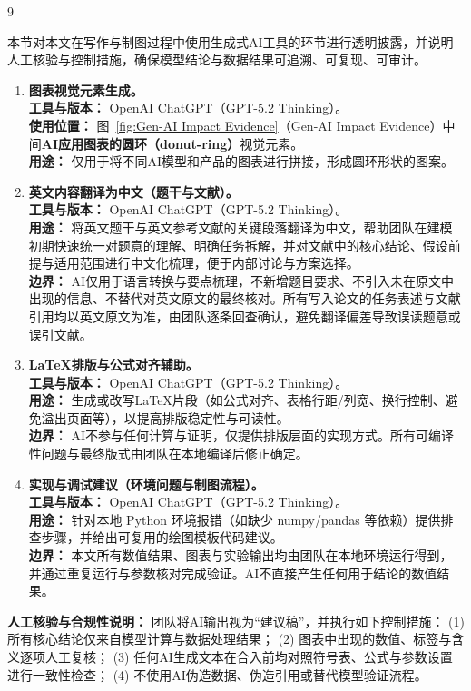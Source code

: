 \documentclass{mcmthesis}
\begin{document}
\begin{ReportAiUse}{9}

本节对本文在写作与制图过程中使用生成式AI工具的环节进行透明披露，并说明人工核验与控制措施，确保模型结论与数据结果可追溯、可复现、可审计。

\begin{enumerate}
\item \textbf{图表视觉元素生成。}\\
\textbf{工具与版本：} OpenAI ChatGPT（GPT-5.2 Thinking）。\\
\textbf{使用位置：} 图~\ref{fig:Gen-AI Impact Evidence}（Gen-AI Impact Evidence）中间\textbf{AI应用图表的圆环（donut-ring）}视觉元素。\\
\textbf{用途：} 仅用于将不同AI模型和产品的图表进行拼接，形成圆环形状的图案。\\


\item \textbf{英文内容翻译为中文（题干与文献）。}\\
\textbf{工具与版本：} OpenAI ChatGPT（GPT-5.2 Thinking）。\\
\textbf{用途：} 将英文题干与英文参考文献的关键段落翻译为中文，帮助团队在建模初期快速统一对题意的理解、明确任务拆解，并对文献中的核心结论、假设前提与适用范围进行中文化梳理，便于内部讨论与方案选择。\\
\textbf{边界：} AI仅用于语言转换与要点梳理，不新增题目要求、不引入未在原文中出现的信息、不替代对英文原文的最终核对。所有写入论文的任务表述与文献引用均以英文原文为准，由团队逐条回查确认，避免翻译偏差导致误读题意或误引文献。

\item \textbf{\LaTeX 排版与公式对齐辅助。}\\
\textbf{工具与版本：} OpenAI ChatGPT（GPT-5.2 Thinking）。\\
\textbf{用途：} 生成或改写\LaTeX 片段（如公式对齐、表格行距/列宽、换行控制、避免溢出页面等），以提高排版稳定性与可读性。\\
\textbf{边界：} AI不参与任何计算与证明，仅提供排版层面的实现方式。所有可编译性问题与最终版式由团队在本地编译后修正确定。

\item \textbf{实现与调试建议（环境问题与制图流程）。}\\
\textbf{工具与版本：} OpenAI ChatGPT（GPT-5.2 Thinking）。\\
\textbf{用途：} 针对本地 Python 环境报错（如缺少 numpy/pandas 等依赖）提供排查步骤，并给出可复用的绘图模板代码建议。\\
\textbf{边界：} 本文所有数值结果、图表与实验输出均由团队在本地环境运行得到，并通过重复运行与参数核对完成验证。AI不直接产生任何用于结论的数值结果。

\end{enumerate}

\noindent \textbf{人工核验与合规性说明：}
团队将AI输出视为“建议稿”，并执行如下控制措施：
(1) 所有核心结论仅来自模型计算与数据处理结果；
(2) 图表中出现的数值、标签与含义逐项人工复核；
(3) 任何AI生成文本在合入前均对照符号表、公式与参数设置进行一致性检查；
(4) 不使用AI伪造数据、伪造引用或替代模型验证流程。

\end{ReportAiUse}
\end{document}
